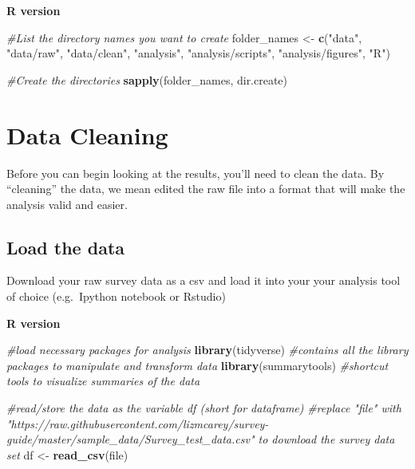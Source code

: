 \documentclass[]{book}
\newenvironment{Shaded}{\begin{snugshade}}{\end{snugshade}}
\newcommand{\CommentTok}[1]{\textcolor[rgb]{0.56,0.35,0.01}{\textit{#1}}}
\newcommand{\KeywordTok}[1]{\textcolor[rgb]{0.13,0.29,0.53}{\textbf{#1}}}
\newcommand{\NormalTok}[1]{#1}
\newcommand{\StringTok}[1]{\textcolor[rgb]{0.31,0.60,0.02}{#1}}
\begin{document}
\textbf{R version}

\begin{Shaded}
\begin{Highlighting}[]
\CommentTok{#List the directory names you want to create}
\NormalTok{folder_names <-}\StringTok{ }\KeywordTok{c}\NormalTok{(}\StringTok{"data"}\NormalTok{, }
                    \StringTok{"data/raw"}\NormalTok{, }
                    \StringTok{"data/clean"}\NormalTok{, }
                  \StringTok{"analysis"}\NormalTok{, }
                    \StringTok{"analysis/scripts"}\NormalTok{, }
                     \StringTok{"analysis/figures"}\NormalTok{, }
                  \StringTok{"R"}\NormalTok{)}

\CommentTok{#Create the directories}
\KeywordTok{sapply}\NormalTok{(folder_names, dir.create)}
\end{Highlighting}
\end{Shaded}

\hypertarget{data-cleaning}{%
\section{Data Cleaning}\label{data-cleaning}}

Before you can begin looking at the results, you'll need to clean the data. By ``cleaning'' the data, we mean edited the raw file into a format that will make the analysis valid and easier.

\hypertarget{load-the-data}{%
\subsection{Load the data}\label{load-the-data}}

Download your raw survey data as a csv and load it into your your analysis tool of choice (e.g.~Ipython notebook or Rstudio)

\textbf{R version}

\begin{Shaded}
\begin{Highlighting}[]
\CommentTok{#load necessary packages for analysis}
\KeywordTok{library}\NormalTok{(tidyverse)        }\CommentTok{#contains all the library packages to manipulate and transform data}
\KeywordTok{library}\NormalTok{(summarytools)     }\CommentTok{#shortcut tools to visualize summaries of the data}

\CommentTok{#read/store the data as the variable df (short for dataframe)}
\CommentTok{#replace "file" with "https://raw.githubusercontent.com/lizmcarey/survey-guide/master/sample_data/Survey_test_data.csv" to download the survey data set}
\NormalTok{df <-}\StringTok{ }\KeywordTok{read_csv}\NormalTok{(file)}
\end{Highlighting}
\end{Shaded}
\end{document}
